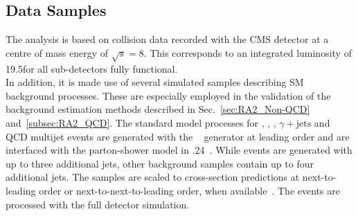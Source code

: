 \subsection{Data Samples}
\label{subsec:RA2_samples_trigger}
The analysis is based on \pp collision data recorded with the CMS detector at a centre of mass energy of $\sqrt{s} = 8$\tev. This corresponds to an integrated luminosity of 19.5\fbinv for all sub-detectors fully functional. \\
In addition, it is made use of several simulated samples describing SM background processes. These are especially employed in the validation of the background estimation methods described in Sec.~\ref{sec:RA2_Non-QCD} and~\ref{subsec:RA2_QCD}. The standard model processes for \ttbar, \WJets, \ZJets, $\gamma + \mathrm{{jets}}$ and QCD multijet events are generated with the \madgraph~\cite{Alwall:2014hca} generator at leading order and are interfaced with the parton-shower model in .24~\cite{Sjostrand:2006za}. While \ttbar events are generated with up to three additional jets, other background samples contain up to four additional jets. The samples are scaled to cross-section predictions at next-to-leading order or next-to-next-to-leading order, when available~\cite{Kidonakis:2010dk, Melnikov:2006kv}. The events are processed with the full detector simulation. 
